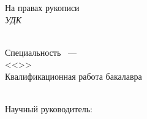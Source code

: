 
\thispagestyle{empty}%
\begin{center}%
    \MakeUppercase{\thesisOrganization}
\end{center}%

\vspace{0pt plus1fill} %
\begin{flushright}%
    На правах рукописи \\
    \textsl {УДК \thesisUdk}
\end{flushright}%

\vspace{0pt plus1fill} %
\begin{center}%
    {\large \thesisAuthor}
\end{center}%

\vspace{0pt plus1fill} %
\begin{center}%
    \textbf {\large \thesisTitle} \\
    \vspace{0pt plus4fill} %
    {%
        Специальность \thesisSpecialtyNumber~--- \\
        <<\thesisSpecialtyTitle>> \\
    }
    \vspace{0pt plus4fill} %
    {
        Квалификационная работа бакалавра \\
        \thesisDegree \\
    }
\end{center}%

\vspace{0pt plus4fill} %
\begin{flushright}%
    Научный руководитель: \\
    \supervisorRegalia \\
    \supervisorFio \\
\end{flushright}%


